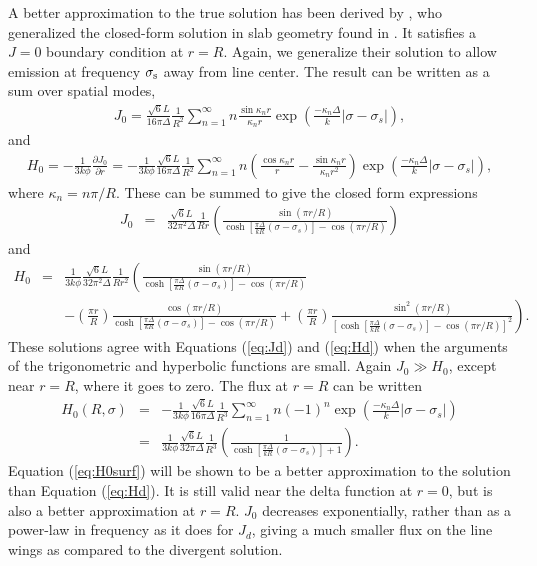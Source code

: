 \documentclass[linenumbers]{aastex63}
\newcommand{\be}{\begin{eqnarray}}
\newcommand{\ee}{\end{eqnarray}}
\begin{document}
A better approximation to the true solution has been derived by \citet{2006ApJ...649...14D}, who generalized the closed-form solution in slab geometry found in \citet{1990ApJ...350..216N}. It satisfies a $J=0$ boundary condition at $r=R$. Again, we generalize their solution to allow emission at frequency $\sigma_{\rm s}$ away from line center. The result can be written as a sum over spatial modes,
\be \label{eq:J0_sum}
J_0 = \frac{\sqrt{6}L}{16\pi \Delta} \frac{1}{R^2}\sum_{n=1}^{\infty}n\frac{\sin{\kappa_n r}}{\kappa_n r}\exp{\left(\frac{-\kappa_n \Delta}{k}|\sigma - \sigma_s|\right)},
\ee
and
\be \label{eq:H0_sum}
H_0 = - \frac{1}{3k\phi} \frac{\partial J_0}{\partial r} = -\frac{1}{3k\phi}\frac{\sqrt{6}L}{16\pi\Delta} \frac{1}{R^2}\sum_{n=1}^{\infty}n\left(\frac{\cos{\kappa_n r}}{r} - \frac{\sin{\kappa_n r}}{\kappa_n r^2}\right)\exp{\left(\frac{-\kappa_n \Delta}{k}|\sigma - \sigma_s|\right)},
\ee
where $\kappa_n=n\pi/R$. These can be summed to give the closed form expressions
\be
J_0 & = & \frac{\sqrt{6}L}{32\pi^2 \Delta}
\frac{1}{Rr}
\left( 
\frac{ \sin(\pi r/R) }{ \cosh \left[ \frac{\pi \Delta}{k R} (\sigma - \sigma_s) \right] - \cos(\pi r/R)}
\right)
\label{eq:J0}
\ee
and
\be
H_0 & = &\frac{1}{3k\phi}
\frac{\sqrt{6}L}{32\pi^2 \Delta}
\frac{1}{Rr^2}
\left( 
\frac{ \sin(\pi r/R) }{ \cosh \left[ \frac{\pi \Delta}{k R} (\sigma - \sigma_s) \right] - \cos(\pi r/R)}
\right. \nonumber \\ & & \left. - \left( \frac{\pi r}{R} \right)
\frac{ \cos(\pi r/R) }{ \cosh \left[ \frac{\pi \Delta}{k R} (\sigma - \sigma_s) \right] - \cos(\pi r/R)}
+ \left( \frac{\pi r}{R} \right)
\frac{ \sin^2(\pi r/R) }{ \left[ \cosh \left[ \frac{\pi \Delta}{k R} (\sigma - \sigma_s) \right] - \cos(\pi r/R) \right]^2 }
\right).
\label{eq:H0}
\ee
These solutions agree with Equations (\ref{eq:Jd}) and (\ref{eq:Hd}) when the arguments of the trigonometric and hyperbolic functions are small. Again $J_0 \gg H_0$, except near $r=R$, where it goes to zero. The flux at $r=R$ can be written
\be
\nonumber
H_0(R, \sigma) & = & - \frac{1}{3k\phi}
\frac{\sqrt{6}L}{16\pi \Delta}
\frac{1}{R^3}
\sum_{n=1}^{\infty} 
n (-1)^n \exp{\left(\frac{-\kappa_n \Delta}{k}|\sigma - \sigma_s|\right)}\\
& = &  \frac{1}{3k\phi}
\frac{\sqrt{6}L}{32\pi \Delta}
\frac{1}{R^3}
\left( 
\frac{ 1 }{ \cosh \left[ \frac{\pi \Delta}{k R} (\sigma - \sigma_s) \right] +1 }
\right).
\label{eq:H0surf}
\ee
Equation (\ref{eq:H0surf}) will be shown to be a better approximation to the solution than Equation (\ref{eq:Hd}). It is still valid near the delta function at $r=0$, but is also a better approximation at $r=R$. $J_0$ decreases exponentially, rather than as a power-law in frequency as it does for $J_d$, giving a much smaller flux on the line wings as compared to the divergent solution. 
\end{document}
